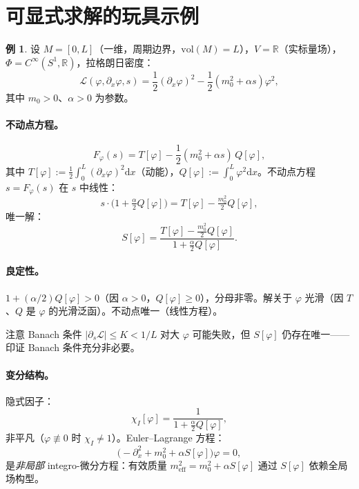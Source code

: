 \documentclass[12pt,a4paper]{article}
\theoremstyle{definition}
\newtheorem{example}[theorem]{例}
\newcommand{\mL}{\mathcal{L}}
\newcommand{\mPhi}{\Phi}
\newcommand{\vol}{\mathrm{vol}}
\newcommand{\R}{\mathbb{R}}
\newcommand{\diff}{\mathrm{d}}
\begin{document}
\appendix

\section{可显式求解的玩具示例}
\label{sec:toy}

\begin{example}
\label{ex:toy}
设 $M = [0, L]$（一维，周期边界，$\vol(M) = L$），$V = \R$（实标量场），$\mPhi = C^\infty(S^1, \R)$，拉格朗日密度：
\begin{equation}
\mL(\varphi, \partial_x\varphi, s) = \frac{1}{2}(\partial_x\varphi)^2 - \frac{1}{2}(m_0^2 + \alpha s)\varphi^2,
\label{eq:toy-L}
\end{equation}
其中 $m_0 > 0$、$\alpha > 0$ 为参数。
\end{example}

\paragraph{不动点方程。}
\[ F_\varphi(s) = T[\varphi] - \frac{1}{2}(m_0^2 + \alpha s)\, Q[\varphi], \]
其中 $T[\varphi] := \frac{1}{2}\int_0^L (\partial_x\varphi)^2 \diff x$（动能），$Q[\varphi] := \int_0^L \varphi^2 \diff x$。不动点方程 $s = F_\varphi(s)$ 在 $s$ 中线性：
\[ s \cdot \bigl(1 + \tfrac{\alpha}{2} Q[\varphi]\bigr) = T[\varphi] - \tfrac{m_0^2}{2} Q[\varphi], \]
唯一解：
\begin{equation}
S[\varphi] = \frac{T[\varphi] - \frac{m_0^2}{2} Q[\varphi]}{1 + \frac{\alpha}{2} Q[\varphi]}.
\label{eq:toy-solution}
\end{equation}

\paragraph{良定性。}
$1 + (\alpha/2) Q[\varphi] > 0$（因 $\alpha > 0$，$Q[\varphi] \geq 0$），分母非零。解关于 $\varphi$ 光滑（因 $T$、$Q$ 是 $\varphi$ 的光滑泛函）。不动点唯一（线性方程）。

注意 Banach 条件 $|\partial_s \mL| \leq K < 1/L$ 对大 $\varphi$ 可能失败，但 $S[\varphi]$ 仍存在唯一——印证 Banach 条件充分非必要。

\paragraph{变分结构。}
隐式因子：
\[ \chi_I[\varphi] = \frac{1}{1 + \frac{\alpha}{2} Q[\varphi]}, \]
非平凡（$\varphi \not\equiv 0$ 时 $\chi_I \neq 1$）。Euler--Lagrange 方程：
\[ \bigl(-\partial_x^2 + m_0^2 + \alpha S[\varphi]\bigr)\varphi = 0, \]
是\emph{非局部} integro-微分方程：有效质量 $m_{\mathrm{eff}}^2 = m_0^2 + \alpha S[\varphi]$ 通过 $S[\varphi]$ 依赖全局场构型。
\end{document}
